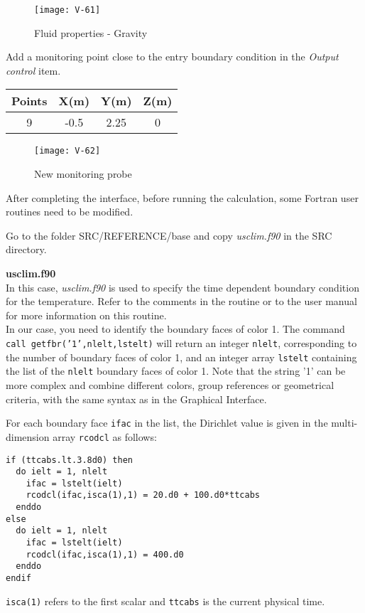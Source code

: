 \begin{figure}[h!]
\begin{center}
\texttt{[image: V-61]}
\caption{Fluid properties - Gravity}
\label{fig2_e3}
\end{center}
\end{figure}


\newpage
Add a monitoring point close to the entry boundary condition in the
{\itshape Output control} item.

\begin{center}
\begin{tabular}{|c|c|c|c|}
\hline
Points & X(m) & Y(m) & Z(m)\\
\hline
9 & -0.5 & 2.25 & 0 \\
\hline
\end{tabular}
\end{center}

\begin{figure}[h!]
\begin{center}
\texttt{[image: V-62]}
\caption{New monitoring probe}
\label{fig3_e3}
\end{center}
\end{figure}


\newpage
After completing the interface, before running the calculation,
some Fortran user routines need to be modified.

Go to the folder SRC/REFERENCE/base and copy {\itshape usclim.f90} in the SRC directory.

\textbf{usclim.f90}\\
In this case, {\itshape usclim.f90} is used to specify the time dependent boundary
condition for
the temperature. Refer to the comments in the routine or to the \CS user manual
for more information on this routine.\\
In our case, you need to identify the boundary faces of color 1. The command\\
\texttt{call getfbr('1',nlelt,lstelt)}
will return an integer \texttt{nlelt}, corresponding to the number of boundary faces of
color 1, and an integer array \texttt{lstelt} containing the list of the \texttt{nlelt} boundary
faces of color 1. Note that the string '1' can be more complex and combine
different colors, group references or geometrical criteria, with the same syntax
as in the Graphical Interface.

For each boundary face \texttt{ifac} in the list, the Dirichlet value is given in the
multi-dimension array \texttt{rcodcl} as follows:
\begin{verbatim}
if (ttcabs.lt.3.8d0) then
  do ielt = 1, nlelt
    ifac = lstelt(ielt)
    rcodcl(ifac,isca(1),1) = 20.d0 + 100.d0*ttcabs
  enddo
else
  do ielt = 1, nlelt
    ifac = lstelt(ielt)
    rcodcl(ifac,isca(1),1) = 400.d0
  enddo
endif
\end{verbatim}
\texttt{isca(1)} refers to the first scalar and \texttt{ttcabs} is the current physical time.

